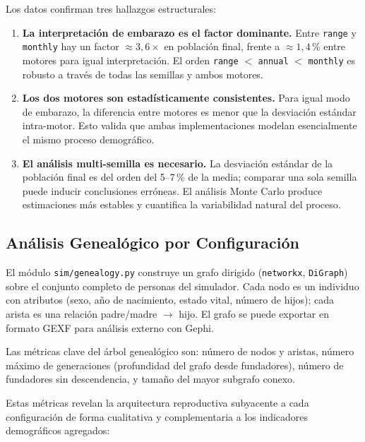 \documentclass{llncs}
\begin{document}
Los datos confirman tres hallazgos estructurales:

\begin{enumerate}
  \item \textbf{La interpretación de embarazo es el factor dominante.}
        Entre \texttt{range} y \texttt{monthly} hay un factor
        $\approx 3{,}6\times$ en población final, frente a $\approx 1{,}4\,\%$
        entre motores para igual interpretación.
        El orden \texttt{range} $<$ \texttt{annual} $<$ \texttt{monthly}
        es robusto a través de todas las semillas y ambos motores.

  \item \textbf{Los dos motores son estadísticamente consistentes.}
        Para igual modo de embarazo, la diferencia entre motores es menor
        que la desviación estándar intra-motor.
        Esto valida que ambas implementaciones modelan esencialmente el
        mismo proceso demográfico.

  \item \textbf{El análisis multi-semilla es necesario.}
        La desviación estándar de la población final es del orden del
        5--7\,\% de la media; comparar una sola semilla puede inducir
        conclusiones erróneas.
        El análisis Monte Carlo produce estimaciones más estables y
        cuantifica la variabilidad natural del proceso.
\end{enumerate}

\subsection{Análisis Genealógico por Configuración}
\label{sec:genealogy}

El módulo \texttt{sim/genealogy.py} construye un grafo dirigido
(\texttt{networkx}, \texttt{DiGraph}) sobre el conjunto completo de personas
del simulador.
Cada nodo es un individuo con atributos (sexo, año de nacimiento, estado
vital, número de hijos); cada arista es una relación padre/madre
$\rightarrow$ hijo.
El grafo se puede exportar en formato GEXF para análisis externo con Gephi.

Las métricas clave del árbol genealógico son: número de nodos y aristas,
número máximo de generaciones (profundidad del grafo desde fundadores),
número de fundadores sin descendencia, y tamaño del mayor subgrafo conexo.

Estas métricas revelan la arquitectura reproductiva subyacente a cada
configuración de forma cualitativa y complementaria a los indicadores
demográficos agregados:
\end{document}
